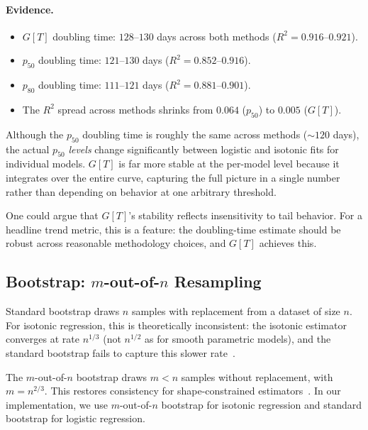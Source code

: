 \documentclass[11pt,a4paper]{article}
\begin{document}
\paragraph{Evidence.}
\begin{itemize}
  \item $G[T]$ doubling time: $128$--$130$ days across both methods ($R^2 = 0.916$--$0.921$).
  \item $p_{50}$ doubling time: $121$--$130$ days ($R^2 = 0.852$--$0.916$).
  \item $p_{80}$ doubling time: $111$--$121$ days ($R^2 = 0.881$--$0.901$).
  \item The $R^2$ spread across methods shrinks from $0.064$ ($p_{50}$) to $0.005$ ($G[T]$).
\end{itemize}

Although the $p_{50}$ doubling time is roughly the same across methods ($\sim$\!$120$ days), the actual $p_{50}$ \emph{levels} change significantly between logistic and isotonic fits for individual models.
$G[T]$ is far more stable at the per-model level because it integrates over the entire curve, capturing the full picture in a single number rather than depending on behavior at one arbitrary threshold.

One could argue that $G[T]$'s stability reflects insensitivity to tail behavior.
For a headline trend metric, this is a feature: the doubling-time estimate should be robust across reasonable methodology choices, and $G[T]$ achieves this.


\subsection{Bootstrap: $m$-out-of-$n$ Resampling}
\label{sec:bootstrap}

Standard bootstrap draws $n$ samples with replacement from a dataset of size $n$.
For isotonic regression, this is theoretically inconsistent: the isotonic estimator converges at rate $n^{1/3}$ (not $n^{1/2}$ as for smooth parametric models), and the standard bootstrap fails to capture this slower rate~\citep{kosorok2008,sen2015}.

The $m$-out-of-$n$ bootstrap draws $m < n$ samples without replacement, with $m = n^{2/3}$.
This restores consistency for shape-constrained estimators~\citep{leger2006}.
In our implementation, we use $m$-out-of-$n$ bootstrap for isotonic regression and standard bootstrap for logistic regression.
\end{document}
